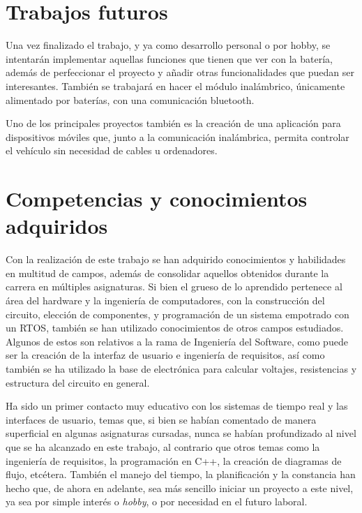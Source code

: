 \section{Trabajos futuros}

Una vez finalizado el trabajo, y ya como desarrollo personal o por hobby, se intentarán implementar aquellas funciones que tienen que ver con la batería, además de perfeccionar el proyecto y añadir otras funcionalidades que puedan ser interesantes. También se trabajará en hacer el módulo inalámbrico, únicamente alimentado por baterías, con una comunicación bluetooth. 

Uno de los principales proyectos también es la creación de una aplicación para dispositivos móviles que, junto a la comunicación inalámbrica, permita controlar el vehículo sin necesidad de cables u ordenadores.

\section{Competencias y conocimientos adquiridos}

Con la realización de este trabajo se han adquirido conocimientos y habilidades en multitud de campos, además de consolidar aquellos obtenidos durante la carrera en múltiples asignaturas. Si bien el grueso de lo aprendido pertenece al área del hardware y la ingeniería de computadores, con la construcción del circuito, elección de componentes, y programación de un sistema empotrado con un RTOS, también se han utilizado conocimientos de otros campos estudiados. Algunos de estos son relativos a la rama de Ingeniería del Software, como puede ser la creación de la interfaz de usuario e ingeniería de requisitos, así como también se ha utilizado la base de electrónica para calcular voltajes, resistencias y estructura del circuito en general. 

Ha sido un primer contacto muy educativo con los sistemas de tiempo real y las interfaces de usuario, temas que, si bien se habían comentado de manera superficial en algunas asignaturas cursadas, nunca se habían profundizado al nivel que se ha alcanzado en este trabajo, al contrario que otros temas como la ingeniería de requisitos, la programación en C++, la creación de diagramas de flujo, etcétera. También el manejo del tiempo, la planificación y la constancia han hecho que, de ahora en adelante, sea más sencillo iniciar un proyecto a este nivel, ya sea por simple interés o \textit{hobby}, o por necesidad en el futuro laboral. 

